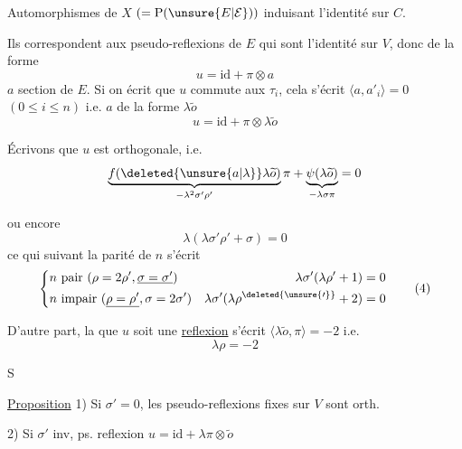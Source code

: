 
 Automorphismes de $X$ $(=\mathrm P(\unsure{E|\mathcal E}))$ induisant l'identité sur $C$.

Ils correspondent aux pseudo-reflexions de $E$ qui sont l'identité sur $V$, donc de la forme
\[
u=\mathrm{id}+\pi\otimes a\tag*{(1)}
\]
$a$ section de $E$. Si on écrit que $u$ commute aux $\tau_i$, cela s'écrit $\langle a,a'_i\rangle=0$ $(0\leq i\leq n)$ i.e. $a$ de la forme $\lambda\widetilde o$
\[
u=\mathrm{id}+\pi\otimes\lambda\widetilde o\tag*{(2)}
\]

Écrivons que $u$ est orthogonale, i.e.
\[
\underbrace{f(\deleted{\unsure{a|\lambda}}\lambda\widetilde o)}_{-\lambda^2\sigma'\rho'}\pi+
\underbrace{\psi(\lambda\widetilde o)}_{-\lambda\sigma\pi}=0
\]

ou encore
\[
\lambda(\lambda\sigma'\rho'+\sigma)=0\tag*{(3)}
\]
ce qui suivant la parité de $n$ s'écrit
\[
\left\{\begin{aligned}
 &n\text{ pair }(\rho=2\rho',\underline{\sigma=\sigma'})&
 \lambda\sigma'(\lambda\rho'+1)&=0\\
 &n\text{ impair }(\underline{\rho=\rho'},\sigma=2\sigma')&
 \lambda\sigma'(\lambda\rho^{\deleted{\unsure{\prime}}}+2)&=0
\end{aligned}\right.\tag*{(4)}
\]

D'autre part, la   que $u$ soit une \uline{reflexion} s'écrit $\langle\lambda\widetilde o,\pi\rangle=-2$ i.e.
\[
\lambda\rho=-2\tag*{(5)}
\]

 S

\uline{Proposition} 1) Si $\sigma'=0$,  les   pseudo-reflexions   fixes sur $V$ sont orth.

2) Si $\sigma'$ inv,  ps. reflexion $u=\mathrm{id}+\lambda\pi\otimes\widetilde o$
